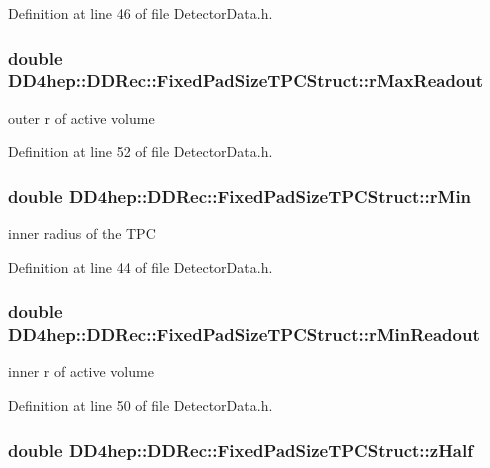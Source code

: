 Definition at line 46 of file DetectorData.h.\hypertarget{struct_d_d4hep_1_1_d_d_rec_1_1_fixed_pad_size_t_p_c_struct_adf51c80b073c09ae26ce58fec05324ae}{
\subsubsection[{rMaxReadout}]{\setlength{\rightskip}{0pt plus 5cm}double {\bf DD4hep::DDRec::FixedPadSizeTPCStruct::rMaxReadout}}}
\label{struct_d_d4hep_1_1_d_d_rec_1_1_fixed_pad_size_t_p_c_struct_adf51c80b073c09ae26ce58fec05324ae}


outer r of active volume 

Definition at line 52 of file DetectorData.h.\hypertarget{struct_d_d4hep_1_1_d_d_rec_1_1_fixed_pad_size_t_p_c_struct_af756bdcb676af4d4fb3b02d7fb8024a8}{
\subsubsection[{rMin}]{\setlength{\rightskip}{0pt plus 5cm}double {\bf DD4hep::DDRec::FixedPadSizeTPCStruct::rMin}}}
\label{struct_d_d4hep_1_1_d_d_rec_1_1_fixed_pad_size_t_p_c_struct_af756bdcb676af4d4fb3b02d7fb8024a8}


inner radius of the TPC 

Definition at line 44 of file DetectorData.h.\hypertarget{struct_d_d4hep_1_1_d_d_rec_1_1_fixed_pad_size_t_p_c_struct_abde215fe45dde9a8bfdbc46499d8daad}{
\subsubsection[{rMinReadout}]{\setlength{\rightskip}{0pt plus 5cm}double {\bf DD4hep::DDRec::FixedPadSizeTPCStruct::rMinReadout}}}
\label{struct_d_d4hep_1_1_d_d_rec_1_1_fixed_pad_size_t_p_c_struct_abde215fe45dde9a8bfdbc46499d8daad}


inner r of active volume 

Definition at line 50 of file DetectorData.h.\hypertarget{struct_d_d4hep_1_1_d_d_rec_1_1_fixed_pad_size_t_p_c_struct_a0985275f7d588c0b441a95ea09706328}{
\subsubsection[{zHalf}]{\setlength{\rightskip}{0pt plus 5cm}double {\bf DD4hep::DDRec::FixedPadSizeTPCStruct::zHalf}}}
\label{struct_d_d4hep_1_1_d_d_rec_1_1_fixed_pad_size_t_p_c_struct_a0985275f7d588c0b441a95ea09706328}


